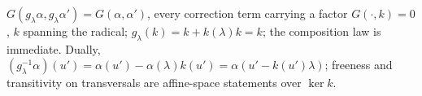 $G(g_\lambda\alpha, g_\lambda\alpha') = G(\alpha, \alpha')$, every correction term carrying a factor $G(\cdot, k) = 0$, $k$ spanning the radical; $g_\lambda(k) = k + k(\lambda)k = k$; the composition law is immediate. Dually, $(g_\lambda^{-1}\alpha)(u') = \alpha(u') - \alpha(\lambda)k(u') = \alpha(u' - k(u')\lambda)$; freeness and transitivity on transversals are affine-space statements over $\ker k$.
